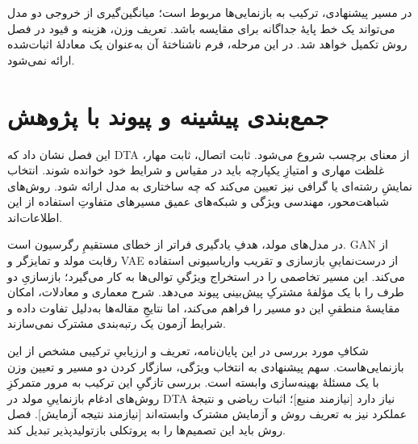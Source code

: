 در مسیر پیشنهادی، ترکیب به بازنمایی‌ها مربوط است؛ میانگین‌گیری از خروجی دو مدل می‌تواند یک خط پایهٔ جداگانه برای مقایسه باشد. تعریف وزن، هزینه و قیود در فصل روش تکمیل خواهد شد. در این مرحله، فرم ناشناختهٔ آن به‌عنوان یک معادلهٔ اثبات‌شده ارائه نمی‌شود.

\section{جمع‌بندی پیشینه و پیوند با پژوهش}
\label{sec:research-gap}
\label{sec:summary-ch2}
این فصل نشان داد که DTA از معنای برچسب شروع می‌شود. ثابت اتصال، ثابت مهار، غلظت مهاری و امتیازِ یکپارچه باید در مقیاس و شرایط خود خوانده شوند. انتخاب نمایشِ رشته‌ای یا گرافی نیز تعیین می‌کند که چه ساختاری به مدل ارائه شود. روش‌های شباهت‌محور، مهندسی ویژگی و شبکه‌های عمیق مسیرهای متفاوتِ استفاده از این اطلاعات‌اند.

در مدل‌های مولد، هدفِ یادگیری فراتر از خطای مستقیمِ رگرسیون است. GAN از رقابت مولد و تمایزگر و VAE از درست‌نماییِ بازسازی و تقریب واریاسیونی استفاده می‌کند.  این مسیر تخاصمی را در استخراج ویژگیِ توالی‌ها به کار می‌گیرد؛  بازسازیِ دو طرف را با یک مؤلفهٔ مشترکِ پیش‌بینی پیوند می‌دهد. شرح معماری و معادلات، امکان مقایسهٔ منطقیِ این دو مسیر را فراهم می‌کند، اما نتایجِ مقاله‌ها به‌دلیل تفاوت داده و شرایط آزمون یک رتبه‌بندی مشترک نمی‌سازند.

شکافِ مورد بررسی در این پایان‌نامه، تعریف و ارزیابیِ ترکیبی مشخص از این بازنمایی‌هاست. سهم پیشنهادی به انتخاب ویژگی، سازگار کردن دو مسیر و تعیین وزن با یک مسئلهٔ بهینه‌سازی وابسته است. بررسی تازگیِ این ترکیب به مرور متمرکزِ روش‌های ادغام بازنماییِ مولد در DTA نیاز دارد [نیازمند منبع]؛ اثبات ریاضی و نتیجهٔ عملکرد نیز به تعریف روش و آزمایش مشترک وابسته‌اند [نیازمند نتیجه آزمایش]. فصل روش باید این تصمیم‌ها را به پروتکلی بازتولیدپذیر تبدیل کند.
